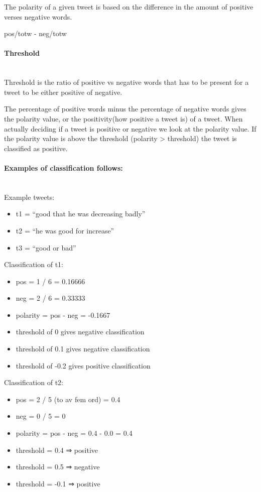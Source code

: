 The polarity of a given tweet is based on the difference in the amount of
positive verses negative words.

pos/totw - neg/totw 

\paragraph{Threshold} 
\hspace{0pt}\\ 
Threshold is the ratio of positive vs negative words that has to be present for a
tweet to be either positive of negative.

The percentage of positive words minus the percentage of negative words gives
the polarity value, or the positivity(how positive a tweet is) of a tweet. 
When actually deciding if a tweet is positive or negative we look at the
polarity value. If the polarity value is above the threshold (polarity >
threshold) the tweet is classified as positive. 

\paragraph{Examples of classification follows:} 
\hspace{0pt}\\ 
Example tweets:
\begin{itemize}
    \item t1 = “good that he was decreasing badly”
    \item t2 = “he was good for increase” 
    \item t3 = “good or bad”
\end{itemize}

Classification of t1:
\begin{itemize}
    \item pos = 1 / 6 = 0.16666
    \item neg = 2 / 6 = 0.33333
    \item polarity = pos - neg = -0.1667
    \item threshold of 0 gives negative classification
    \item threshold of 0.1 gives negative classification
    \item threshold of -0.2 gives positive classification
\end{itemize}

Classification of t2:
\begin{itemize}
    \item pos = 2 / 5 (to av fem ord) = 0.4
    \item neg = 0 / 5 = 0
    \item polarity = pos - neg = 0.4 - 0.0 = 0.4
    \item threshold = 0.4 ⇒ positive
    \item threshold = 0.5 ⇒ negative
    \item threshold = -0.1 ⇒ positive
\end{itemize}

